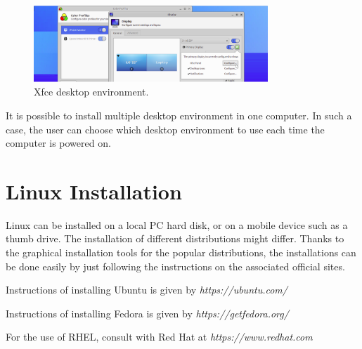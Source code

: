 \begin{figure}
	\centering
	\includegraphics[width=250pt]{chapters/chapter1/figures/xfce_demo.png}
	\caption{Xfce desktop environment.} \label{ch1fig:xfcedemo}
\end{figure}

It is possible to install multiple desktop environment in one computer. In such a case, the user can choose which desktop environment to use each time the computer is powered on.

\section{Linux Installation}

Linux can be installed on a local PC hard disk, or on a mobile device such as a thumb drive. The installation of different distributions might differ. Thanks to the graphical installation tools for the popular distributions, the installations can be done easily by just following the instructions on the associated official sites.

Instructions of installing Ubuntu is given by \textit{https://ubuntu.com/}

Instructions of installing Fedora is given by \textit{https://getfedora.org/}

For the use of RHEL, consult with Red Hat at \textit{https://www.redhat.com}











